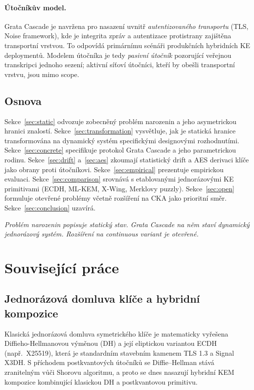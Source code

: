 \documentclass[11pt,a4paper]{article}
\begin{document}
\paragraph{Útočníkův model.} Grata Cascade je navržena pro nasazení uvnitř \emph{autentizovaného transportu} (TLS, Noise framework), kde je integrita zpráv a autentizace protistrany zajištěna transportní vrstvou. To odpovídá primárnímu scénáři produkčních hybridních KE deploymentů. Modelem útočníka je tedy \emph{pasivní útočník} pozorující veřejnou transkripci jednoho sezení; aktivní síťoví útočníci, kteří by obešli transportní vrstvu, jsou mimo scope.

\subsection{Osnova}\label{sec:outline}

Sekce~\ref{sec:static} odvozuje zobecněný problém narozenin a jeho asymetrickou hranici znalostí. Sekce~\ref{sec:transformation} vysvětluje, jak je statická hranice transformována na dynamický systém specifickými designovými rozhodnutími. Sekce~\ref{sec:concrete} specifikuje protokol Grata Cascade a jeho parametrickou rodinu. Sekce~\ref{sec:drift} a~\ref{sec:aes} zkoumají statistický drift a AES derivaci klíče jako obrany proti útočníkovi. Sekce~\ref{sec:empirical} prezentuje empirickou evaluaci. Sekce~\ref{sec:comparison} srovnává s etablovanými jednorázovými KE primitivami (ECDH, ML-KEM, X-Wing, Merklovy puzzly). Sekce~\ref{sec:open} formuluje otevřené problémy včetně rozšíření na CKA jako prioritní směr. Sekce~\ref{sec:conclusion} uzavírá.

\medskip
\noindent\textit{Problém narozenin popisuje statický stav. Grata Cascade na něm staví dynamický jednorázový systém. Rozšíření na continuous variant je otevřené.}

\section{Související práce}\label{sec:related}

\subsection{Jednorázová domluva klíče a hybridní kompozice}\label{sec:related-oneshot}

Klasická jednorázová domluva symetrického klíče je matematicky vyřešena Diffieho-Hellmanovou výměnou (DH) a její eliptickou variantou ECDH (např.\ X25519), která je standardním stavebním kamenem TLS 1.3 a Signal X3DH. S příchodem postkvantových útočníků se Diffie--Hellman stává zranitelným vůči Shorovu algoritmu, a proto se dnes nasazují hybridní KEM kompozice kombinující klasickou DH a postkvantovou primitivu.
\end{document}

